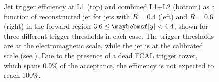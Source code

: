 \begin{figure}[htpb]
{    \label{fig:detector:forward_bin_triggers_L1L2_akt6}}
  \caption{Jet trigger efficiency at L1 (top) and combined L1+L2 (bottom) as a function of
           reconstructed jet \pT for \akt jets with $R=0.4$ (left) and $R=0.6$ (right) in the
           forward region $3.6 \leq \absRap < 4.4$, shown for three different trigger thresholds in each case.
           The trigger thresholds are at the electromagnetic scale, while the jet \pT is at the
           calibrated scale (see ). Due
           to the presence of a dead FCAL trigger tower, which spans 0.9\% of the
           \etaphi acceptance, the efficiency is not expected to reach 100\%.}
  \label{fig:detector:forward_bin_trigger_efficiencies}
\end{figure}
